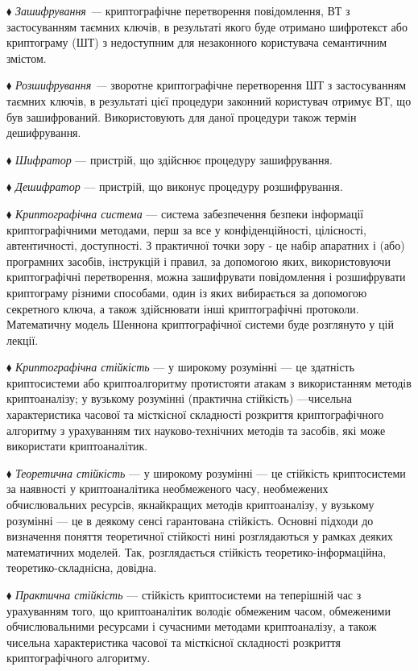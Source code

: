 $\blacklozenge$ \textit{Зашифрування --- }криптографічне перетворення
повідомлення, ВТ з застосуванням таємних ключів, в результаті якого буде
отримано шифротекст  або криптограму (ШТ) з недоступним для
незаконного користувача семантичним змістом.

$\blacklozenge$ \textit{Розшифрування --- }зворотне криптографічне
перетворення ШТ з застосуванням таємних ключів, в результаті цієї процедури
законний користувач отримує ВТ, що був зашифрований.  Використовують для даної
процедури також термін дешифрування.

$\blacklozenge$ \textit{Шифратор }--- пристрій, що здійснює процедуру
зашифрування.

$\blacklozenge$ \textit{Дешифратор }--- пристрій, що виконує процедуру
розшифрування.

$\blacklozenge$ \textit{Криптографічна система }--- система забезпечення безпеки
інформації криптографічними методами, перш за все у конфіденційності,
цілісності, автентичності, доступності. З практичної точки зору -  це набір
апаратних і (або) програмних засобів, інструкцій і правил, за допомогою яких,
використовуючи криптографічні перетворення, можна зашифрувати  повідомлення і
розшифрувати криптограму різними способами, один із яких вибирається за
допомогою секретного ключа, а також здійснювати інші криптографічні протоколи.
Математичну модель Шеннона криптографічної системи буде розглянуто у цій
лекції.

$\blacklozenge$ \textit{Криптографічна стійкість }--- у широкому розумінні --- це
здатність криптосистеми або криптоалгоритму протистояти атакам з використанням
методів криптоаналізу; у вузькому розумінні (практична стійкість) ---чисельна
характеристика часової та місткісної складності розкриття криптографічного
алгоритму з урахуванням тих науково-технічних методів та засобів, які може
використати криптоаналітик.

$\blacklozenge$ \textit{Теоретична стійкість }---  у широкому розумінні --- це
стійкість криптосистеми за наявності у криптоаналітика необмеженого часу,
необмежених обчислювальних ресурсів, якнайкращих методів криптоаналізу, у
вузькому розумінні --- це в деякому сенсі гарантована стійкість. Основні підходи
до визначення поняття теоретичної стійкості нині розглядаються у рамках деяких
математичних моделей. Так, розглядається стійкість теоретико-інформаційна,
теоретико-складнісна, довідна. 

$\blacklozenge$ \textit{Практична стійкість }--- стійкість криптосистеми на
теперішній час з урахуванням того, що криптоаналітик володіє обмеженим часом,
обмеженими обчислювальними ресурсами і сучасними методами криптоаналізу,  а
також чисельна характеристика часової та місткісної складності розкриття
криптографічного алгоритму. 


